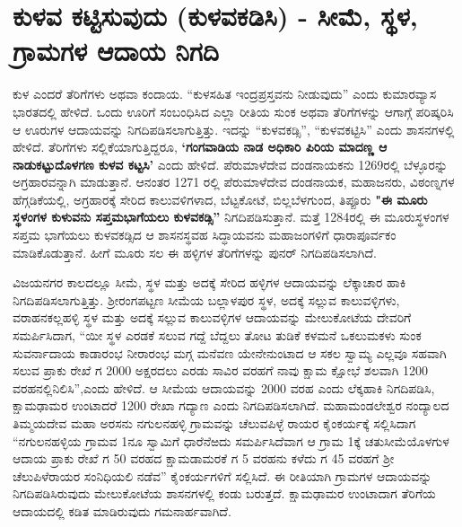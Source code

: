 \section*{ಕುಳವ ಕಟ್ಟಿಸುವುದು (ಕುಳವಕಡಿಸಿ) - ಸೀಮೆ, ಸ್ಥಳ, ಗ್ರಾಮಗಳ ಆದಾಯ ನಿಗದಿ}

ಕುಳ ಎಂದರೆ ತೆರಿಗೆಗಳು ಅಥವಾ ಕಂದಾಯ. “ಕುಳಸಹಿತ ಇಂದ್ರಪ್ರಸ್ತವನು ನೀಡುವುದು” ಎಂದು ಕುಮಾರವ್ಯಾಸ ಭಾರತದಲ್ಲಿ ಹೇಳಿದೆ. ಒಂದು ಊರಿಗೆ ಸಂಬಂಧಿಸಿದ ಎಲ್ಲಾ ರೀತಿಯ ಸುಂಕ ಅಥವಾ ತೆರಿಗೆಗಳನ್ನು ಆಗಾಗ್ಗೆ ಪರಿಷ್ಕರಿಸಿ ಆ ಊರುಗಳ ಆದಾಯವನ್ನು ನಿಗದಿಪಡಿಸಲಾಗುತ್ತಿತ್ತು. ಇದನ್ನು “ಕುಳವಕಡ್ಸಿ”, “ಕುಳವಕಟ್ಟಿಸಿ” ಎಂದು ಶಾಸನಗಳಲ್ಲಿ ಹೇಳಿದೆ. ತೆರಿಗೆಗಳು ಸಲ್ಲಿಕೆಯಾಗುತ್ತಿದ್ದರೂ, \textbf{‘ಗಂಗವಾಡಿಯ ನಾಡ ಅಧಿಕಾರಿ ಪಿರಿಯ ಮಾದಣ್ಣ ಆ ನಾಡುಕಟ್ಟುದೊಳಗಣ ಕುಳವ ಕಟ್ಟಸಿ’} ಎಂದು ಹೇಳಿದೆ. ಪೆರುಮಾಳೆದೇವ ದಂಡನಾಯಕನು 1269ರಲ್ಲಿ ಬೆಳ್ಳೂರನ್ನು ಅಗ್ರಹಾರವನ್ನಾಗಿ ಮಾಡುತ್ತಾನೆ. ಆನಂತರ 1271 ರಲ್ಲಿ ಪೆರುಮಾಳೆದೇವ ದಂಡನಾಯಕ, ಮಹಾಜನರು, ವಿಠಂಣ್ನಗಳ ಹೆಗ್ಗಡಿಕೆಯಲ್ಲಿ, ಅಗ್ರಹಾರಕ್ಕೆ ಸೇರಿದ ಕಾಲುವಳಿಗಳಾದ, ಬೆಟ್ಟಕೋಟೆ, ಬಿಲ್ಲಬೆಳಗುಂದ, ತಿಪ್ಪೂರು \textbf{"ಈ ಮೂರು ಸ್ಥಳಂಗಳ ಕುಳುವನು ಸಪ್ತಮಭಾಗೆಯಲು ಕುಳವಕಡ್ಸಿ”} ನಿಗದಿಪಡಿಸುತ್ತಾನೆ. ಮತ್ತೆ 1284ರಲ್ಲಿ ಈ ಮೂರುಸ್ಥಳಂಗಳ ಸಪ್ತಮ ಭಾಗೆಯಲು ಕುಳವಕಡ್ಸಿದ ಆ ಶಾಸನಸ್ಥವಹ ಸಿದ್ಧಾಯವನು ಮಹಾಜಂಗಳಿಗೆ ಧಾರಾಪೂರ್ವಕಂ ಮಾಡಿಕೊಡುತ್ತಾನೆ. ಹೀಗೆ ಮೂರು ಸಲ ಈ ಹಳ್ಳಿಗಳ ತೆರಿಗೆಗಳನ್ನು ಪುನರ್​ ನಿಗದಿಪಡಿಸಲಾಗಿದೆ.

ವಿಜಯನಗರ ಕಾಲದಲ್ಲೂ ಸೀಮೆ, ಸ್ಥಳ ಮತ್ತು ಅದಕ್ಕೆ ಸೇರಿದ ಹಳ್ಳಿಗಳ ಆದಾಯವನ್ನು ಲೆಕ್ಕಾಚಾರ ಹಾಕಿ ನಿಗದಿಪಡಿಸಲಾಗುತ್ತಿತ್ತು. ಶ‍್ರೀರಂಗಪಟ್ಟಣ ಸೀಮೆಯ ಬಲ್ಲಾಳಪುರ ಸ್ಥಳ, ಅದಕ್ಕೆ ಸಲ್ಲುವ ಕಾಲುವಳ್ಳಿಗಳು, ವರಾಹನಕಲ್ಲಹಳ್ಳಿ ಸ್ಥಳ ಮತ್ತು ಅದಕ್ಕೆ ಸಲ್ಲುವ ಕಾಲುವಳ್ಳಿಗಳ ಆದಾಯವನ್ನು ಮೇಲುಕೋಟೆಯ ದೇವರಿಗೆ ಸಮರ್ಪಿಸಿದಾಗ, “ಯೀ ಸ್ಥಳ ಎರಡಕೆ ಸಲುವ ಗದ್ದೆ ಬೆದ್ದಲು ತೋಟ ತುಡಿಕೆ ಕಳಮನೆ ಒಕಲುಮಕಳು ಸುಂಕ ಸುವರ್ನಾದಾಯ ಕಾಡಾರಂಭ ನೀರಾರಂಭ ಮಗ್ಗ ಮನೆವಣ ಯೇನೇನುಂಟಾದ ಆ ಸಕಲ ಸ್ವಾಮ್ಯ ಎಲ್ಲವೂ ಸಹವಾಗಿ ಸಲುವ ಪ್ರಾಕು ರೇಖೆ ಗ 2000 ಅಕ್ಷರದಲು ಎರಡು ಸಾವಿರ ವರಹಗೆ ನಾವು ಕ್ಷಾಮ ಕ್ಷೋಭೆ ಶಲವಾಗಿ 1200 ವರಹನಲ್ಲಿನಿಲಿಸಿ”,ಎಂದು ಹೇಳಿದೆ. ಆ ಸೀಮೆಯ ಆದಾಯವನ್ನು 2000 ವರಹ ಎಂದು ಲೆಕ್ಕಹಾಕಿ ನಿಗದಿಪಡಿಸಿ, ಕ್ಷಾಮಢಾಮರ ಉಂಟಾದರೆ 1200 ರೇಖಾ ಗದ್ಯಾಣ ಎಂದು ನಿಗದಿಪಡಿಸಲಾಗಿದೆ. ಮಹಾಮಂಡಲೇಶ್ವರ ನಂದ್ಯಾಲದ ತಿಮ್ಮಯದೇವ ಮಹಾ ಅರಸನು ನಗುಲನಹಳ್ಳಿ ಗ್ರಾಮವನ್ನು ಚೆಲುವಪಿಳ್ಳೆ ರಾಯರ ಕೈಂಕರ್ಯಕ್ಕೆ ಸಲ್ಲಿಸಿದಾಗ “ನಗುಲನಹಳ್ಳಿಯ ಗ್ರಾಮವ 1ನೂ ಸ್ವಾಮಿಗೆ ಧಾರೆನೆಱದು ಸಮರ್ಪಿಸಿದೆವಾಗ ಆ ಗ್ರಾಮ 1ಕ್ಕೆ ಚತುಸೀಮೆಯೊಳಗುಳ ಆದಾಯ ಪ್ರಾಕು ರೇಖೆ ಗ 50 ವರಹದ ಕ್ಷಾಮಡಾಮರಕೆ ಗ 5 ವರಹನು ಕಳೆದು ಗ 45 ವರಹಗೆ ಶ‍್ರೀ ಚೆಲುಪಿಳೆರಾಯರ ಸಂನಿಧಿಯಲಿ ನಡೆವ” ಕೈಂಕರ್ಯಗಳಿಗೆ ಸಲ್ಲಿಸಿದೆ. ಈ ರೀತಿಯಾಗಿ ಗ್ರಾಮಗಳ ಆದಾಯವನ್ನು ನಿಗದಿಪಡಿಸಿರುವುದು ಮೇಲುಕೋಟೆಯ ಶಾಸನಗಳಲ್ಲಿ ಕಂಡು ಬರುತ್ತದೆ. ಕ್ಷಾಮಢಾಮರ ಉಂಟಾದಾಗ ತೆರಿಗೆಯ ಆದಾಯದಲ್ಲಿ ಕಡಿತ ಮಾಡಿರುವುದು ಗಮನಾರ್ಹವಾಗಿದೆ.

